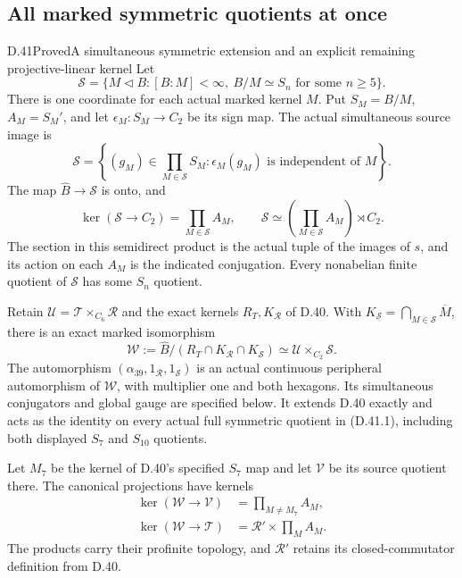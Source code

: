 \subsection{All marked symmetric quotients at once}

\begin{statement}{D.41}{Proved}{A simultaneous symmetric extension and an explicit remaining projective-linear kernel}
Let
\[
 \mathscr S=\{M\lhd B:[B:M]<\infty,\ B/M\simeq S_n
                         \text{ for some }n\ge5\}.
                                                               \tag{D.41.1}
\]
There is one coordinate for each actual marked kernel $M$.
Put $S_M=B/M$, $A_M=S_M'$, and let $\epsilon_M:S_M\to C_2$
be its sign map. The actual simultaneous source image is
\[
 \mathcal S
   =\left\{(g_M)\in\prod_{M\in\mathscr S}S_M:
             \epsilon_M(g_M)\text{ is independent of }M\right\}.
                                                               \tag{D.41.2}
\]
The map $\widehat B\to\mathcal S$ is onto, and
\[
 \ker(\mathcal S\to C_2)=\prod_{M\in\mathscr S}A_M,\qquad
 \mathcal S\simeq
       \left(\prod_{M\in\mathscr S}A_M\right)\rtimes C_2.
                                                               \tag{D.41.3}
\]
The section in this semidirect product is the actual
tuple of the images of $s$, and its action on each
$A_M$ is the indicated conjugation. Every nonabelian
finite quotient of $\mathcal S$ has some $S_n$ quotient.

Retain $\mathcal U=\mathcal T\times_{C_6}\mathcal R$ and
the exact kernels $R_T,K_{\mathcal R}$ of D.40. With
$K_{\mathcal S}=\bigcap_{M\in\mathscr S}\overline M$,
there is an exact marked isomorphism
\[
 \mathcal W
   :=\widehat B/(R_T\cap K_{\mathcal R}\cap K_{\mathcal S})
     \simeq\mathcal U\mathbin{\times_{C_2}}\mathcal S.
                                                               \tag{D.41.4}
\]
The automorphism
$(\alpha_{39},1_{\mathcal R},1_{\mathcal S})$ is an
actual continuous peripheral automorphism of
$\mathcal W$, with multiplier one and both hexagons.
Its simultaneous conjugators and global gauge are
specified below. It extends D.40 exactly and acts
as the identity on every actual full symmetric
quotient in (D.41.1), including both displayed
$S_7$ and $S_{10}$ quotients.

Let $M_7$ be the kernel of D.40's specified $S_7$ map
and let $\mathcal V$ be its source quotient there.
The canonical projections have kernels
\[
 \begin{split}
 \ker(\mathcal W\to\mathcal V)
     &=\prod_{M\ne M_7}A_M,\\
 \ker(\mathcal W\to\mathcal T)
     &=\mathcal R'\times\prod_M A_M .
 \end{split}                                             \tag{D.41.5}
\]
The products carry their profinite topology, and
$\mathcal R'$ retains its closed-commutator definition
from D.40.


\end{statement}
